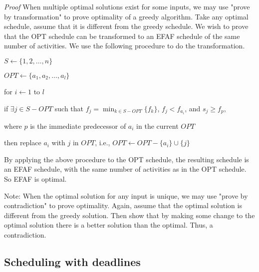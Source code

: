 \documentclass{article}
\begin{document}
\begin{itemize}
{\em Proof} When multiple optimal solutions exist for some inputs,
we may use "prove by transformation" to prove optimality of a greedy
algorithm. 
Take any optimal schedule, assume that it is different from the greedy
schedule.
We wish to prove that the OPT schedule can be transformed
to an EFAF schedule of the same number of activities. We use
the following procedure to do the transformation.

\qquad $S\leftarrow\{1,2,\ldots,n\}$
\par\qquad $OPT\leftarrow\{a_1,a_2,\ldots,a_l\}$
\par\qquad for $i\leftarrow 1$ to $l$
\par\qquad\qquad if $\exists j\in S-OPT$ such that $f_j=\min_{k\in S-OPT}
\{f_k\}$, $f_j<f_{a_i}$, and $s_j\ge f_p$, 
\par\qquad\qquad\qquad where $p$ is the immediate
predecessor of $a_i$ in the current $OPT$
\par\qquad\qquad then replace $a_i$ with $j$ in $OPT$, i.e.,
$OPT\leftarrow OPT-\{a_i\}\cup\{j\}$

By applying the above procedure to the OPT schedule, the
resulting schedule is an EFAF schedule, with the same number
of activities as in the OPT schedule. So EFAF is optimal.

Note: When the optimal solution for any input is unique,
we may use "prove by contradiction" to prove optimality.
Again, assume that the optimal solution is different from the
greedy solution. Then show that by making some change to the optimal
solution there is a better solution than the optimal. Thus, a contradiction.

\end{itemize}

\subsection{Scheduling with deadlines}

\end{document}
